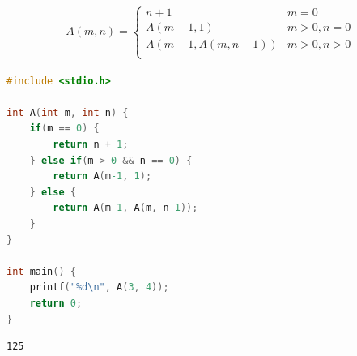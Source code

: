 \vspace{0.5cm}


\begin{align}\nonumber
	A(m, n) =
	\begin{cases}
		n + 1             & m = 0        \\
		A(m-1, 1)         & m > 0, n = 0 \\
		A(m-1, A(m, n-1)) & m > 0, n > 0 \\
	\end{cases}
\end{align}

\begin{lstlisting}[language=C]
#include <stdio.h>

int A(int m, int n) {
    if(m == 0) {
        return n + 1;
    } else if(m > 0 && n == 0) {
        return A(m-1, 1);
    } else {
        return A(m-1, A(m, n-1));
    }
}

int main() {
    printf("%d\n", A(3, 4));
    return 0;
}
\end{lstlisting}

\begin{tcolorbox}
	\begin{verbatim}
125
	\end{verbatim}
\end{tcolorbox}

